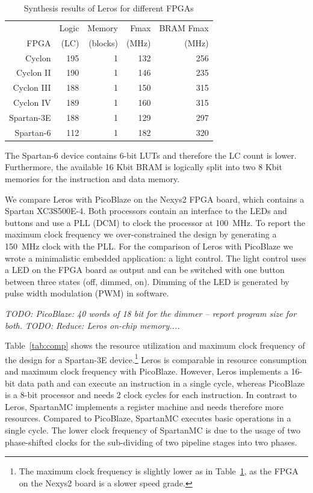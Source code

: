 \documentclass[a4paper,fontsize=10pt,twoside,DIV15,BCOR12mm,headinclude=true,footinclude=false,pagesize,bibtotoc]{scrbook}
\newcommand{\todo}[1]{{\emph{TODO: #1}}}
\begin{document}
\begin{table}
\small
\centering 
\caption{Synthesis results of Leros for different FPGAs}
\label{tab:synth}
\begin{tabular}{rrrrr}
\toprule
 & Logic & Memory & Fmax & BRAM Fmax \\
 FPGA & (LC) & (blocks) & (MHz) & (MHz) \\
\midrule
Cyclon & 195 & 1 & 132 & 256 \\
Cyclon II & 190 & 1 & 146 & 235 \\
Cyclon III & 188 & 1 & 150 & 315 \\
Cyclon IV & 189 & 1 & 160 & 315 \\
Spartan-3E & 188 & 1 & 129 & 297 \\
Spartan-6 & 112 & 1 & 182 &  320 \\
\bottomrule
\end{tabular}
\end{table}


The Spartan-6 device contains 6-bit LUTs and therefore the LC count is lower. Furthermore, the available 16 Kbit BRAM is logically split into two 8 Kbit memories for the instruction and data memory.


We compare Leros with PicoBlaze on the Nexys2 FPGA board, which contains a Spartan XC3S500E-4. Both processors contain an interface to the LEDs and buttons and use a PLL (DCM) to clock the processor at 100~MHz. To report the maximum clock frequency we over-constrained the design by generating a 150~MHz clock with the PLL.
For the comparison of Leros with PicoBlaze we wrote a minimalistic embedded application: a light control. The light control uses a LED on the FPGA board as output and can be switched with one button between three states (off, dimmed, on). Dimming of the LED is generated by pulse width modulation (PWM) in software.

\todo{PicoBlaze: 40 words of 18 bit for the dimmer -- report program size for both.}
\todo{Reduce: Leros on-chip memory....}

Table~\ref{tab:comp} shows the resource utilization and maximum clock frequency of the design for a Spartan-3E device.\footnote{The maximum clock frequency is slightly lower as in Table~\ref{tab:synth}, as the FPGA on the Nexys2 board is a slower speed grade.} Leros is comparable in resource consumption and maximum clock frequency with PicoBlaze. However, Leros implements a 16-bit data path and can execute an instruction in a single cycle, whereas PicoBlaze is a 8-bit processor and needs 2 clock cycles for each instruction.
%
In contrast to Leros, SpartanMC implements a register machine and needs therefore more resources. Compared to PicoBlaze, SpartanMC executes basic operations in a single cycle. The lower clock frequency of SpartanMC is due to the usage of two phase-shifted clocks for the sub-dividing of two pipeline stages into two phases.
\end{document}

